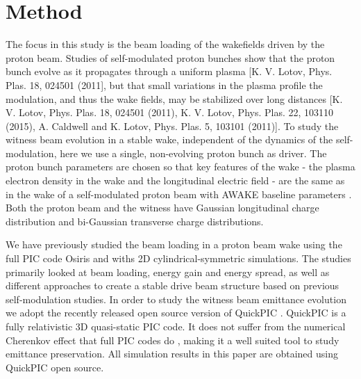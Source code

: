\documentclass[aps,prstab,reprint,amsmath,amssymb,groupedaddress,onecolumn]{revtex4-1}
\begin{document}


\section[\label{S:M}]{Method}

The focus in this study is the beam loading of the wakefields driven by the proton beam.   Studies of self-modulated proton bunches show that the proton bunch evolve as it propagates through a uniform plasma [K. V. Lotov, Phys. Plas. 18, 024501 (2011], but that small variations in the plasma profile the modulation, and thus the wake fields, may be stabilized over long distances [K. V. Lotov, Phys. Plas. 18, 024501 (2011), K. V. Lotov, Phys. Plas. 22, 103110 (2015), A. Caldwell and K. Lotov, Phys. Plas. 5, 103101 (2011)].   To study the witness beam evolution in a stable wake, independent of the dynamics of the self-modulation, %
here we use a single, non-evolving proton bunch as driver.  The proton bunch parameters are chosen so that key features of the wake - the plasma electron density in the wake and the longitudinal electric field - are the same as %
in the wake of a self-modulated proton beam with AWAKE baseline parameters \cite{gschwendtner:2016}.  Both the proton beam and the witness have Gaussian %
longitudinal charge distribution and bi-Gaussian transverse charge distributions.

We have previously studied the beam loading in a proton beam wake using the full PIC code Osiris \cite{fonseca:2002}
and withs 2D cylindrical-symmetric simulations.  The studies \cite{berglyd_olsen:2015, berglyd_olsen:2016} primarily looked at beam loading, energy gain and energy spread, as well as different approaches to create a stable drive beam structure based on previous self-modulation studies.  In order to study the witness beam emittance evolution we adopt the recently released open source version of QuickPIC \cite{huang:2006, an:2013}. QuickPIC is a fully relativistic 3D quasi-static PIC code. It does not suffer from
the numerical Cherenkov effect that full PIC codes do \cite{godfrey:1974,lehe:2013}, making it a well suited tool to
study emittance preservation.  All simulation results in this paper are %
obtained using QuickPIC open source.  
\end{document}
